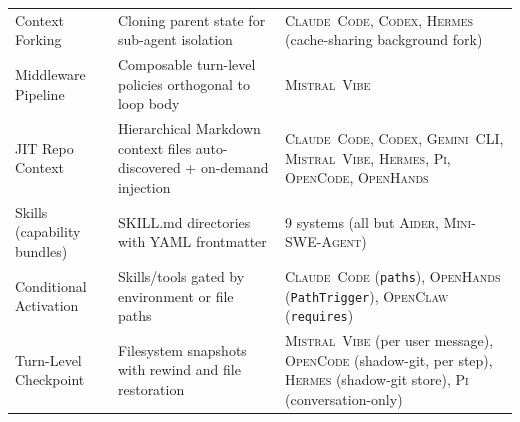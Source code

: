 \documentclass[11pt,a4paper]{article}
\newcommand{\clcode}{\textsc{Claude~Code}\xspace}
\newcommand{\cdx}{\textsc{Codex}\xspace}
\newcommand{\oh}{\textsc{OpenHands}\xspace}
\newcommand{\adr}{\textsc{Aider}\xspace}
\newcommand{\mswe}{\textsc{Mini-SWE-Agent}\xspace}
\newcommand{\ocl}{\textsc{OpenClaw}\xspace}
\newcommand{\vibe}{\textsc{Mistral~Vibe}\xspace}
\newcommand{\gemini}{\textsc{Gemini~CLI}\xspace}
\newcommand{\hrm}{\textsc{Hermes}\xspace}
\newcommand{\pib}{\textsc{Pi}\xspace}
\newcommand{\ocd}{\textsc{OpenCode}\xspace}
\begin{document}
\begin{table}[H]
\begin{tabularx}{\textwidth}{@{}L{3cm} L{4.6cm} L{4.9cm}@{}}
Context Forking           & Cloning parent state for sub-agent isolation & \clcode{}, \cdx{}, \hrm{} (cache-sharing background fork) \\
Middleware Pipeline       & Composable turn-level policies orthogonal to loop body & \vibe{} \\
JIT Repo Context          & Hierarchical Markdown context files auto-discovered + on-demand injection & \clcode{}, \cdx{}, \gemini{}, \vibe{}, \hrm{}, \pib{}, \ocd{}, \oh{} \\
Skills (capability bundles) & SKILL.md directories with YAML frontmatter & 9 systems (all but \adr{}, \mswe{}) \\
Conditional Activation    & Skills/tools gated by environment or file paths & \clcode{} (\texttt{paths}), \oh{} (\texttt{PathTrigger}), \ocl{} (\texttt{requires}) \\
Turn-Level Checkpoint     & Filesystem snapshots with rewind and file restoration & \vibe{} (per user message), \ocd{} (shadow-git, per step), \hrm{} (shadow-git store), \pib{} (conversation-only) \\
\bottomrule
\end{tabularx}
\end{table}
\end{document}
